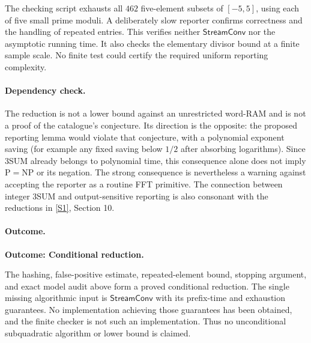 \documentclass[11pt,a4paper]{article}
\newcommand{\sref}[2]{\hyperlink{source:#1:#2}{[S#2]}}
\numberwithin{equation}{section}
\begin{document}
The checking script exhausts all $462$ five-element subsets of
$[-5,5]$, using each of five small prime moduli. A deliberately slow
reporter confirms correctness and the handling of repeated entries.
This verifies neither $\mathsf{StreamConv}$ nor the asymptotic running
time. It also checks the elementary divisor bound at a finite sample
scale. No finite test could certify the required uniform reporting
complexity.

\paragraph{Dependency check.}
The reduction is not a lower bound against an unrestricted word-RAM and
is not a proof of the catalogue's conjecture. Its direction is the
opposite: the proposed reporting lemma would violate that conjecture,
with a polynomial exponent saving (for example any fixed saving below
$1/2$ after absorbing logarithms). Since 3SUM already belongs to
polynomial time, this consequence alone does not imply
$\mathrm P=\mathrm{NP}$ or its negation. The strong consequence is
nevertheless a warning against accepting the reporter as a routine FFT
primitive. The connection between integer 3SUM and output-sensitive
reporting is also consonant with the reductions in
\sref{30006762}{1}, Section 10.

\paragraph{Outcome.}
\textbf{Outcome: Conditional reduction.}

The hashing, false-positive estimate, repeated-element bound, stopping
argument, and exact model audit above form a proved conditional reduction.
The single missing algorithmic input is $\mathsf{StreamConv}$ with its
prefix-time and exhaustion guarantees. No implementation achieving those
guarantees has been obtained, and the finite checker is not such an
implementation. Thus no unconditional subquadratic algorithm or lower
bound is claimed.
\end{document}
